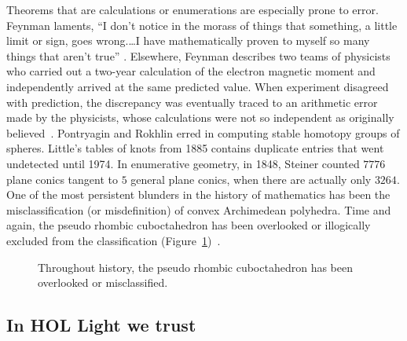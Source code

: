 \documentclass{llncs}
\begin{document}

Theorems that are calculations or enumerations are especially prone to
error.  Feynman laments, ``I don't notice in the morass of things that something, a
little limit or sign, goes wrong.\dots I have mathematically proven to myself
so many things that aren't true''
\cite[p.~885]{FeCo}. Elsewhere, Feynman describes two teams of
physicists who carried out a two-year calculation of the electron
magnetic moment and independently arrived at the same predicted value.
When experiment disagreed with prediction, the discrepancy was
eventually traced to an arithmetic error made by the physicists, whose
calculations were not so independent as originally
believed~\cite[p.~117]{FQED}.  Pontryagin and Rokhlin erred in
computing stable homotopy groups of spheres.  Little's tables of knots
from 1885 contains duplicate entries that went undetected until 1974.
In enumerative geometry, in 1848, Steiner counted $7776$ plane conics
tangent to $5$ general plane conics, when there are actually only
$3264$.  One of the most persistent blunders in the history of
mathematics has been the misclassification (or misdefinition) of
convex Archimedean polyhedra.  Time and again, the pseudo rhombic
cuboctahedron has been overlooked or illogically excluded from the
classification (Figure~\ref{fig:pseudo})~\cite{Gr11}.

\begin{figure}[h!]
  \centering
\figPSEUDO
\caption{Throughout history, the pseudo rhombic cuboctahedron has been
  overlooked or misclassified.}
\label{fig:pseudo}
\end{figure}



\subsection{In HOL Light we trust}
\end{document}
